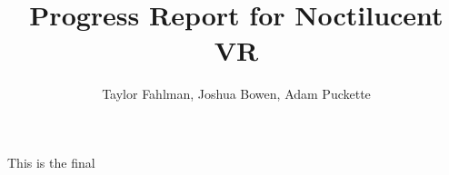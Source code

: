 \documentclass[draftclsnofoot,onecolumn]{IEEEtran}
\begin{document}
\title {Progress Report for Noctilucent VR}
\author {Taylor Fahlman, Joshua Bowen, Adam Puckette}

\maketitle

\abstract
This is the final
\end{document}
